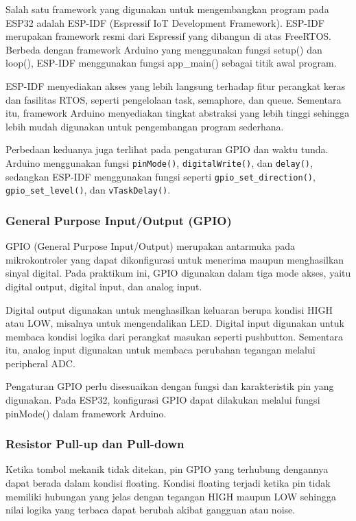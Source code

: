 Salah satu framework yang digunakan untuk mengembangkan program pada ESP32 adalah ESP-IDF (Espressif IoT Development Framework). ESP-IDF merupakan framework resmi dari Espressif yang dibangun di atas FreeRTOS. Berbeda dengan framework Arduino yang menggunakan fungsi setup() dan loop(), ESP-IDF menggunakan fungsi app\_main() sebagai titik awal program.

ESP-IDF menyediakan akses yang lebih langsung terhadap fitur perangkat keras dan fasilitas RTOS, seperti pengelolaan task, semaphore, dan queue. Sementara itu, framework Arduino menyediakan tingkat abstraksi yang lebih tinggi sehingga lebih mudah digunakan untuk pengembangan program sederhana.

Perbedaan keduanya juga terlihat pada pengaturan GPIO dan waktu tunda. Arduino menggunakan fungsi \texttt{pinMode()}, \texttt{digitalWrite()}, dan \texttt{delay()}, sedangkan ESP-IDF menggunakan fungsi seperti \texttt{gpio\_set\_direction()}, \texttt{gpio\_set\_level()}, dan \texttt{vTaskDelay()}.

\subsubsection{General Purpose Input/Output (GPIO)}
GPIO (General Purpose Input/Output) merupakan antarmuka pada mikrokontroler yang dapat dikonfigurasi untuk menerima maupun menghasilkan sinyal digital. Pada praktikum ini, GPIO digunakan dalam tiga mode akses, yaitu digital output, digital input, dan analog input.

Digital output digunakan untuk menghasilkan keluaran berupa kondisi HIGH atau LOW, misalnya untuk mengendalikan LED. Digital input digunakan untuk membaca kondisi logika dari perangkat masukan seperti pushbutton. Sementara itu, analog input digunakan untuk membaca perubahan tegangan melalui peripheral ADC.

Pengaturan GPIO perlu disesuaikan dengan fungsi dan karakteristik pin yang digunakan. Pada ESP32, konfigurasi GPIO dapat dilakukan melalui fungsi pinMode() dalam framework Arduino.

\subsubsection{Resistor Pull-up dan Pull-down}
Ketika tombol mekanik tidak ditekan, pin GPIO yang terhubung dengannya dapat berada dalam kondisi floating. Kondisi floating terjadi ketika pin tidak memiliki hubungan yang jelas dengan tegangan HIGH maupun LOW sehingga nilai logika yang terbaca dapat berubah akibat gangguan atau noise.

